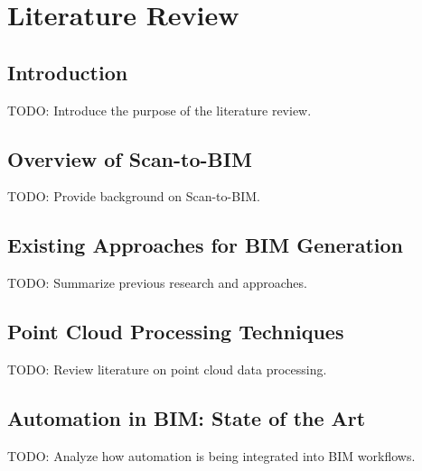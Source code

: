 \chapter{Literature Review}
\label{sec:literature_review}

\section{Introduction}
TODO: Introduce the purpose of the literature review.

\section{Overview of Scan-to-BIM}
TODO: Provide background on Scan-to-BIM.

\section{Existing Approaches for BIM Generation}
TODO: Summarize previous research and approaches.

\section{Point Cloud Processing Techniques}
TODO: Review literature on point cloud data processing.

\section{Automation in BIM: State of the Art}
TODO: Analyze how automation is being integrated into BIM workflows.

